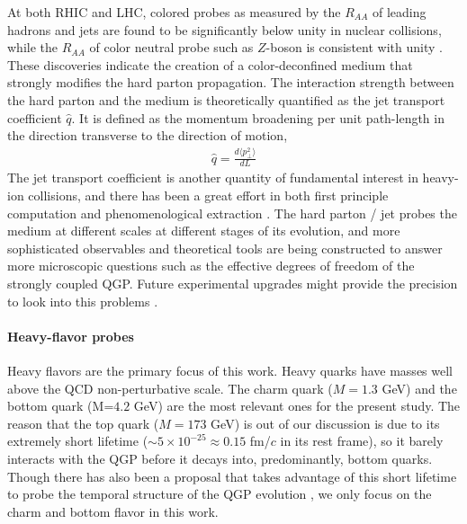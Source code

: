 At both RHIC and LHC, colored probes as measured by the $R_{AA}$ of leading hadrons and jets are found to be significantly below unity in nuclear collisions, while the $R_{AA}$ of color neutral probe such as $Z$-boson is consistent with unity \cite{Adare:2008qa,Chatrchyan:2011ua,Afanasiev:2012dg,Aad:2012ew,Aad:2015lcb,Adam:2015lda,ATLAS:2017zkv}.
These discoveries indicate the creation of a color-deconfined medium that strongly modifies the hard parton propagation.
The interaction strength between the hard parton and the medium is theoretically quantified as the jet transport coefficient $\hat{q}$. It is defined as the momentum broadening per unit path-length in the direction transverse to the direction of motion,
\begin{eqnarray}
\hat{q} = \frac{d\langle p_\perp^2 \rangle}{dL}
\end{eqnarray}
The jet transport coefficient is another quantity of fundamental interest  in heavy-ion collisions, and there has been a great effort in both first principle computation and phenomenological extraction \cite{Wang:1994fx,Zakharov:1996fv,Baier:1996sk,Zakharov:1997uu,Arnold:2002zm,Gyulassy:2003mc,Kovner:2003zj,Jeon:2003gi,CasalderreySolana:2007pr,Djordjevic:2008iz,Bass:2008rv,Schenke:2009gb,Majumder:2009zu,Majumder:2010qh,Armesto:2011ht,Zapp:2011ya,Ovanesyan:2011xy,Kang:2014xsa,Cao:2016gvr,Kauder:2018cdt,Cao:2017zih}.
The hard parton / jet probes the medium at different scales at different stages of its evolution, and more sophisticated observables and theoretical tools are being constructed to answer more microscopic questions such as the effective degrees of freedom of the strongly coupled QGP.
Future experimental upgrades might provide the precision to look into this problems \cite{ATLAS-Collaboration:2012iwa,Abelevetal:2014dna,STAR:upgrade-hf,Adare:2015kwa,CMS:2017dec}.

\paragraph{Heavy-flavor probes}
Heavy flavors are the primary focus of this work.
Heavy quarks have masses well above the QCD non-perturbative scale.
The charm quark ($M=1.3$ GeV) and the bottom quark (M=$4.2$ GeV) are the most relevant ones for the present study.
The reason that the top quark ($M = 173$ GeV) is out of our discussion is due to its extremely short lifetime ($\sim 5\times 10^{-25} \approx 0.15$  fm/$c$ in its rest frame), so it barely interacts with the QGP before it decays into, predominantly, bottom quarks.
Though there has also been a proposal that takes advantage of this short lifetime to probe the temporal structure of the QGP evolution \cite{Apolinario:2017sob}, we only focus on the charm and bottom flavor in this work.

